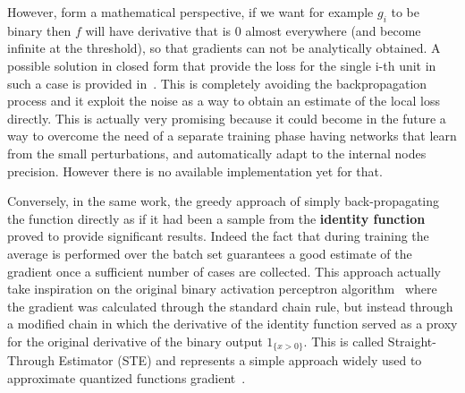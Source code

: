 However, form a mathematical perspective, if we want for example $g_i$ to be binary then $f$ will have derivative that is 0 almost everywhere (and become infinite at the threshold), so that gradients can not be analytically obtained.
A possible solution in closed form that provide the loss for the single i-th unit in such a case is provided in~\cite{bengio2013estimating}. This is completely avoiding the backpropagation process and it exploit the noise as a way to obtain an estimate of the local loss directly. This is actually very promising because it could become in the future a way to overcome the need of a separate training phase having networks that learn from the small perturbations, and automatically adapt to the internal nodes precision. However there is no available implementation yet for that.

Conversely, in the same work, the greedy approach of simply back-propagating the function directly as if it had been a sample from the \textbf{identity function} proved to provide significant results. Indeed the fact that during training the average is performed over the batch set guarantees a good estimate of the gradient once a sufficient number of cases are collected.
This approach actually take inspiration on the original binary activation perceptron algorithm~\cite{Rosenblatt58theperceptron} where the gradient was calculated through the standard chain rule, but instead through a modified chain in which the derivative of the identity function served as a proxy for the original derivative of the binary output $1_{\{x>0\}}$.
This is called Straight-Through Estimator (STE) and represents a simple approach widely used to approximate quantized functions gradient~\cite{yin2019understanding}.


